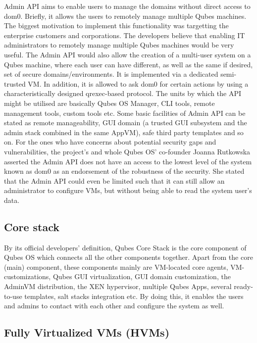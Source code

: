 \documentclass[runningheads,a4paper]{article}
\begin{document}
Admin API aims to enable users to manage the
domains without direct access to dom0. Briefly, it allows the users to
remotely manage multiple Qubes machines.  The biggest motivation to
implement this functionality was targetting the enterprise customers
and corporations. The developers believe that enabling IT
administrators to remotely manage multiple Qubes machines would be
very useful.  The Admin API would also allow the creation of a
multi-user system on a Qubes machine, where each user can have
different, as well as the same if desired, set of secure
domains/environments.  It is implemented via a dedicated semi-trusted
VM. In addition, it is allowed to ask dom0 for certain actions by
using a characteristically designed qrexec-based protocol.  The units
by which the API might be utilised are basically Qubes OS Manager, CLI
tools, remote management tools, custom tools etc. Some basic
facilities of Admin API can be stated as remote manageability, GUI
domain (a trusted GUI subsystem and the admin stack combined in the
same AppVM), safe third party templates and so on. For the ones who
have concerns about potential security gaps and vulnerabilities, the
project's and whole Qubes OS' co-founder Joanna Rutkowska asserted the
Admin API does not have an access to the lowest level of the system
known as dom0 as an endorsement of the robustness of the security. She
stated that the Admin API could even be limited such that it can still
allow an administrator to configure VMs, but without being able to
read the system user's data.

\subsection{Core stack} 

By its official developers' definition, Qubes
Core Stack is the core component of Qubes OS which connects all the
other components together. Apart from the core (main) component, these
components mainly are VM-located core agents, VM-customizations, Qubes
GUI virtualization, GUI domain customization, the AdminVM
distribution, the XEN hypervisor, multiple Qubes Apps, several
ready-to-use templates, salt stacks integration etc.  By doing this,
it enables the users and admins to contact with each other and
configure the system as well.

\subsection{Fully Virtualized VMs (HVMs)} 
\end{document}
